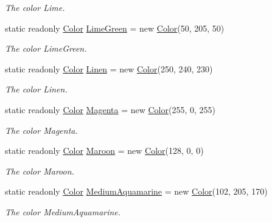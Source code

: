 \begin{DoxyCompactItemize}
\begin{DoxyCompactList}\small\item\em The color Lime. \end{DoxyCompactList}\item 
static readonly \hyperlink{struct_tri_devs_1_1_tri_engine_1_1_color}{Color} \hyperlink{struct_tri_devs_1_1_tri_engine_1_1_color_a7408d8285684036df25b41b593bda8fe}{Lime\-Green} = new \hyperlink{struct_tri_devs_1_1_tri_engine_1_1_color}{Color}(50, 205, 50)
\begin{DoxyCompactList}\small\item\em The color Lime\-Green. \end{DoxyCompactList}\item 
static readonly \hyperlink{struct_tri_devs_1_1_tri_engine_1_1_color}{Color} \hyperlink{struct_tri_devs_1_1_tri_engine_1_1_color_a3f1151f59eb1a9ada08341f3a1c6db21}{Linen} = new \hyperlink{struct_tri_devs_1_1_tri_engine_1_1_color}{Color}(250, 240, 230)
\begin{DoxyCompactList}\small\item\em The color Linen. \end{DoxyCompactList}\item 
static readonly \hyperlink{struct_tri_devs_1_1_tri_engine_1_1_color}{Color} \hyperlink{struct_tri_devs_1_1_tri_engine_1_1_color_aed285d74a7434212626e08aa320f050d}{Magenta} = new \hyperlink{struct_tri_devs_1_1_tri_engine_1_1_color}{Color}(255, 0, 255)
\begin{DoxyCompactList}\small\item\em The color Magenta. \end{DoxyCompactList}\item 
static readonly \hyperlink{struct_tri_devs_1_1_tri_engine_1_1_color}{Color} \hyperlink{struct_tri_devs_1_1_tri_engine_1_1_color_aee8f74c09cc6f1f4b4ec7b7b16488bb2}{Maroon} = new \hyperlink{struct_tri_devs_1_1_tri_engine_1_1_color}{Color}(128, 0, 0)
\begin{DoxyCompactList}\small\item\em The color Maroon. \end{DoxyCompactList}\item 
static readonly \hyperlink{struct_tri_devs_1_1_tri_engine_1_1_color}{Color} \hyperlink{struct_tri_devs_1_1_tri_engine_1_1_color_aeafaef273b17a33a242877239225d8fa}{Medium\-Aquamarine} = new \hyperlink{struct_tri_devs_1_1_tri_engine_1_1_color}{Color}(102, 205, 170)
\begin{DoxyCompactList}\small\item\em The color Medium\-Aquamarine. \end{DoxyCompactList}\item 

\end{DoxyCompactItemize}
